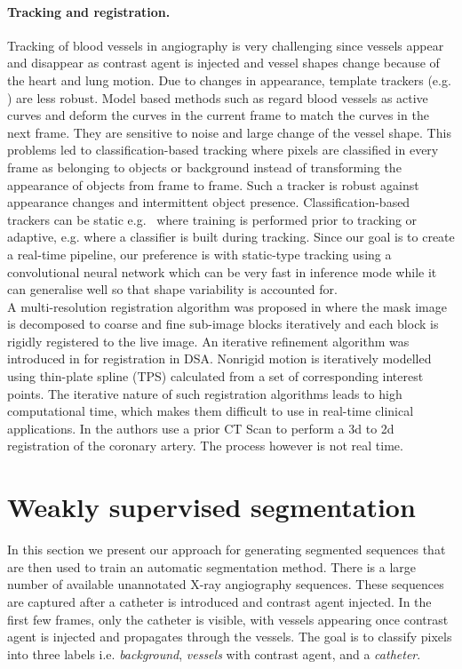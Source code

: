 \documentclass{bmvc2k}
\begin{document}
	\paragraph{Tracking and registration.} Tracking of blood vessels in angiography is very challenging since vessels appear and disappear as contrast agent is injected and vessel shapes change because of the heart and lung motion. Due to changes in appearance, template trackers (e.g. \cite{templ_track1}) are less robust.  Model based methods such as \cite{elastic1} regard blood vessels as active curves and deform the curves in the current frame to match the curves in the next frame. They are sensitive to noise and large change of the vessel shape. This problems led to classification-based tracking where pixels are classified in every frame as belonging to objects or background instead of transforming the appearance of objects from frame to frame. Such a tracker is robust against appearance changes and intermittent object presence. Classification-based trackers can be static e.g.~\cite{static_track} where training is performed prior to tracking  or adaptive, e.g. \cite{adaptive_track} where a classifier is built during tracking. Since our goal is to create a real-time pipeline, our preference is with static-type tracking using a convolutional neural network which can be very fast in inference mode while it can generalise well so that shape variability is accounted for.\\
	A multi-resolution registration algorithm was proposed in \cite{yang1}  where the mask image is decomposed to coarse and fine sub-image blocks iteratively and each block is rigidly registered to the live image. 
	An iterative refinement algorithm was introduced in \cite{wang} for registration in DSA. Nonrigid motion is iteratively modelled using thin-plate spline (TPS)  calculated from a set of corresponding interest points. The iterative nature of such registration algorithms leads to high computational time, which makes them difficult to use in real-time clinical applications. In \cite{2d-3d-registration} the authors use a prior CT Scan to perform a 3d to 2d registration of the coronary artery. The process however is not real time.
	
	\section{Weakly supervised segmentation}
	In this section we present our approach for generating segmented sequences that are then used to train an automatic segmentation method.  
	There is a large number of available unannotated X-ray angiography sequences. These sequences are captured after a catheter is introduced and contrast agent injected. In the first few frames, only the catheter is visible, with vessels appearing once contrast agent is injected and propagates through the vessels. The goal is to classify pixels into three labels i.e. {\em background}, {\em vessels} with contrast agent, and a {\em catheter}. 
	
\end{document}

